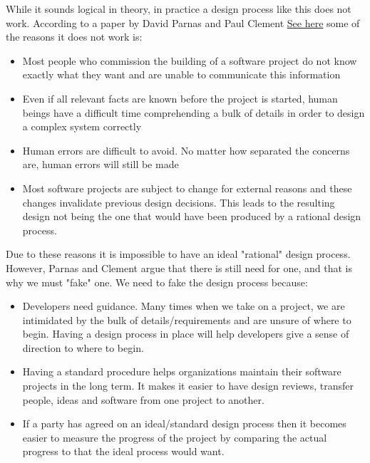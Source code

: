 \documentclass[12pt]{article}
\begin{document}
\begin{enumerate}[(a)]
While it sounds logical in theory, in practice a design process like this does not work. According to a paper by David Parnas and Paul Clement
\href{See https://www.researchgate.net/publication/260649064_A_Rational_Design_Process_How_and_Why_to_Fake_i}{See here} some of the reasons it does not 
work is:
\begin{itemize}[(a)]

\item Most people who commission the building of a software project do not know exactly what they want and are unable to communicate this information

\item Even if all relevant facts are known before the project is started, human beings have a difficult time comprehending a bulk of details in order to design a complex system correctly

\item Human errors are difficult to avoid. No matter how separated the concerns are, human errors will still be made

\item Most software projects are subject to change for external reasons and these changes invalidate previous design decisions. This leads to the resulting design not being the one that would have been produced by a rational design process.
\end{itemize}

Due to these reasons it is impossible to have an ideal "rational" design process. However, Parnas and Clement argue that there is still need for one, and that is why we must "fake" one. We need to fake the design process because:

\begin{itemize}[(a)]

\item Developers need guidance. Many times when we take on a project, we are intimidated by the bulk of details/requirements and are unsure of where to begin. Having a design process in place will help developers give a sense of direction to where to begin.

\item Having a standard procedure helps organizations maintain their software projects in the long term. It makes it easier to have design reviews, transfer people, ideas and software from one project to another. 

\item If a party has agreed on an ideal/standard design process then it becomes easier to measure the progress of the project by comparing the actual progress to that the ideal process would want. 


\end{itemize}
\end{enumerate}
\end{document}
